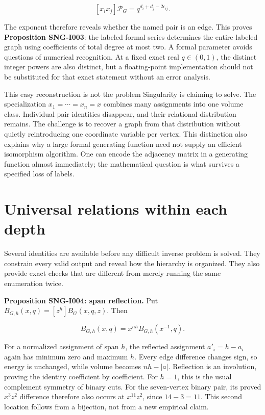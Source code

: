 \documentclass[
  11pt,
  a4paper,
]{report}
\begin{document}
\[
[x_ix_j]\mathscr P_G=q^{d_i+d_j-2\epsilon_{ij}}.
\]

The exponent therefore reveals whether the named pair is an edge. This
proves \textbf{Proposition SNG-I003}: the labeled formal series
determines the entire labeled graph using coefficients of total degree
at most two. A formal parameter avoids questions of numerical
recognition. At a fixed exact real \(q\in(0,1)\), the distinct integer
powers are also distinct, but a floating-point implementation should not
be substituted for that exact statement without an error analysis.

This easy reconstruction is not the problem Singularity is claiming to
solve. The specialization \(x_1=\cdots=x_n=x\) combines many assignments
into one volume class. Individual pair identities disappear, and their
relational distribution remains. The challenge is to recover a graph
from that distribution without quietly reintroducing one coordinate
variable per vertex. This distinction also explains why a large formal
generating function need not supply an efficient isomorphism algorithm.
One can encode the adjacency matrix in a generating function almost
immediately; the mathematical question is what survives a specified loss
of labels.

\hypertarget{universal-relations-within-each-depth}{%
\section{Universal relations within each
depth}\label{universal-relations-within-each-depth}}

Several identities are available before any difficult inverse problem is
solved. They constrain every valid output and reveal how the hierarchy
is organized. They also provide exact checks that are different from
merely running the same enumeration twice.

\textbf{Proposition SNG-I004: span reflection.} Put
\(B_{G,h}(x,q)=[z^h]B_G(x,q,z)\). Then

\[
B_{G,h}(x,q)=x^{nh}B_{G,h}(x^{-1},q).
\]

For a normalized assignment of span \(h\), the reflected assignment
\(a'_i=h-a_i\) again has minimum zero and maximum \(h\). Every edge
difference changes sign, so energy is unchanged, while volume becomes
\(nh-|a|\). Reflection is an involution, proving the identity
coefficient by coefficient. For \(h=1\), this is the usual complement
symmetry of binary cuts. For the seven-vertex binary pair, its proved
\(x^3z^2\) difference therefore also occurs at \(x^{11}z^2\), since
\(14-3=11\). This second location follows from a bijection, not from a
new empirical claim.
\end{document}
